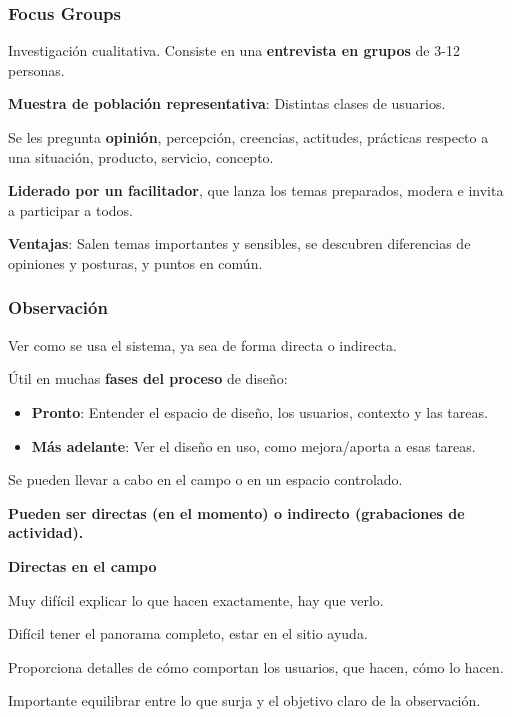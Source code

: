 \hypertarget{focus-groups}{%
\subsubsection{Focus Groups}\label{focus-groups}}

Investigación cualitativa. Consiste en una \textbf{entrevista en grupos}
de 3-12 personas.

\textbf{Muestra de población representativa}: Distintas clases de
usuarios.

Se les pregunta \textbf{opinión}, percepción, creencias, actitudes,
prácticas respecto a una situación, producto, servicio, concepto.

\textbf{Liderado por un facilitador}, que lanza los temas preparados,
modera e invita a participar a todos.

\textbf{Ventajas}: Salen temas importantes y sensibles, se descubren
diferencias de opiniones y posturas, y puntos en común.

\hypertarget{observaciuxf3n}{%
\subsubsection{Observación}\label{observaciuxf3n}}

Ver como se usa el sistema, ya sea de forma directa o indirecta.

Útil en muchas \textbf{fases del proceso} de diseño:

\begin{itemize}
\tightlist
\item
  \textbf{Pronto}: Entender el espacio de diseño, los usuarios, contexto
  y las tareas.
\item
  \textbf{Más adelante}: Ver el diseño en uso, como mejora/aporta a esas
  tareas.
\end{itemize}

Se pueden llevar a cabo en el campo o en un espacio controlado.

\textbf{Pueden ser directas (en el momento) o indirecto (grabaciones de
actividad).}

\textbf{Directas en el campo}

Muy difícil explicar lo que hacen exactamente, hay que verlo.

Difícil tener el panorama completo, estar en el sitio ayuda.

Proporciona detalles de cómo comportan los usuarios, que hacen, cómo lo
hacen.

Importante equilibrar entre lo que surja y el objetivo claro de la
observación.

